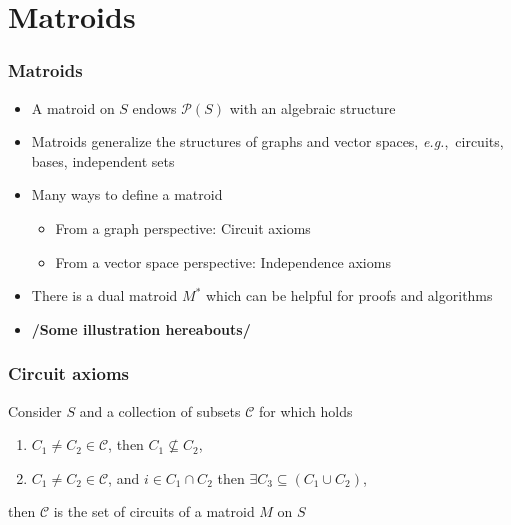 \documentclass[bigger]{beamer}
\newcommand{\eg}{{\em e.g.},~}
\begin{document}
\section{Matroids}



\begin{frame}
\frametitle{Matroids}
\begin{itemize}


\item A matroid on $S$ endows $\mathcal{P}(S)$ with an algebraic
  structure 
\item Matroids generalize the structures of graphs and vector spaces,
  \eg circuits, bases, independent sets
\item Many ways to define a matroid
  \begin{itemize}
  \item From a graph perspective: Circuit axioms
  \item From a vector space perspective: Independence axioms
  \end{itemize}
\item There is a dual matroid $M^*$ which can be helpful for proofs and algorithms 
\item \textbf{/Some illustration hereabouts/}
\end{itemize} %
\end{frame}



\begin{frame}
\frametitle{Circuit axioms}

Consider $S$ and a collection of subsets $\mathscr{C}$ for which holds
\begin{enumerate}
\item $C_1 \neq C_2 \in \mathscr{C}$, then $C_1 \nsubseteq C_2$,
\item $C_1 \neq C_2 \in \mathscr{C}$, and $i \in C_1 \cap C_2$ then
   $\exists C_3 \subseteq (C_1 \cup C_2)$,
\end{enumerate}
then $\mathscr{C}$ is the set of circuits of a matroid $M$ on $S$



\end{frame}


\end{document}
